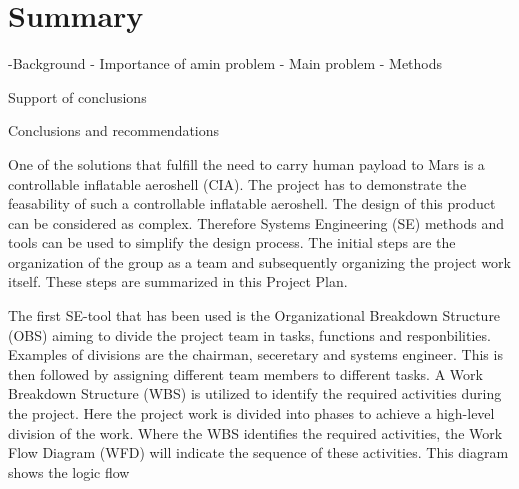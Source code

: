 \section*{Summary}\label{cha:summary}
-Background
- Importance of amin problem
- Main problem
- Methods

Support of conclusions

Conclusions and recommendations

One of the solutions that fulfill the need to carry human payload to Mars is a controllable inflatable aeroshell (CIA). The project has to demonstrate the feasability of such a controllable inflatable aeroshell. The design of this product can be considered as complex. Therefore Systems Engineering (SE) methods and tools can be used to simplify the design process. The initial steps are the organization of the group as a team and subsequently organizing the project work itself. These steps are summarized in this Project Plan.

The first SE-tool that has been used is the Organizational Breakdown Structure (OBS) aiming to divide the project team in tasks, functions and responbilities. Examples of divisions are the chairman, seceretary and systems engineer. This is then followed by assigning different team members to different tasks. A Work Breakdown Structure (WBS) is utilized to identify the required activities during the project. Here the project work is divided into phases to achieve a high-level division of the work. Where the WBS identifies the required activities, the Work Flow Diagram (WFD) will indicate the sequence of these activities. This diagram shows the logic flow